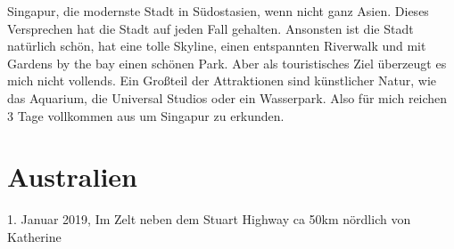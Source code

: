 \documentclass[11pt]{book}
\begin{document}
Singapur, die modernste Stadt in Südostasien, wenn nicht ganz Asien. Dieses Versprechen hat die Stadt auf jeden Fall gehalten. Ansonsten 
ist die Stadt natürlich schön, hat eine tolle Skyline, einen entspannten Riverwalk und mit Gardens by the bay einen schönen Park. Aber 
als touristisches Ziel überzeugt es mich nicht vollends. Ein Großteil der Attraktionen sind künstlicher Natur, wie das Aquarium, die Universal 
Studios oder ein Wasserpark. Also für mich reichen 3 Tage vollkommen aus um Singapur zu erkunden.


\chapter{Australien}

1. Januar 2019, Im Zelt neben dem Stuart Highway ca 50km nördlich von Katherine
\end{document}
